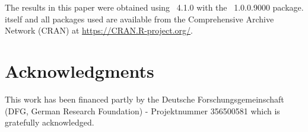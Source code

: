 \documentclass[article]{jss}
\begin{document}
The results in this paper were obtained using
~4.1.0 with the
~1.0.0.9000 package.  itself
and all packages used are available from the Comprehensive
 Archive Network (CRAN) at \url{https://CRAN.R-project.org/}.


\section*{Acknowledgments}

This work has been financed partly by the Deutsche Forschungsgemeinschaft (DFG, German Research Foundation) - Projektnummer 356500581 which is gratefully acknowledged.


\end{document}
